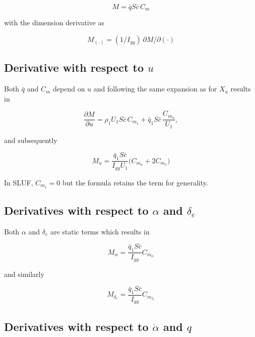 \documentclass[11pt]{article}
\newcommand{\qbar}{\bar{q}}
\newcommand{\cbar}{\bar{c}}
\newcommand{\Iyy}{I_{yy}}
\newcommand{\dd}[2]{\dfrac{\partial #1}{\partial #2}}
\begin{document}
\begin{equation}\label{eq:equation_20}
M = \qbar S \cbar\,C_m
\end{equation}

with the dimension derivative as

\begin{equation}\label{eq:equation_21}
M_{(\cdot)} = (1/\Iyy)\,\partial M/\partial(\cdot)
\end{equation}

\subsection{Derivative with respect to $u$}

Both $\qbar$ and $C_m$ depend on $u$ and following the same expansion as for $X_u$ results in

\begin{equation}\label{eq:equation_22}
\dd{M}{u} = \rho_1 U_1 S\cbar\,C_{m_1} + \qbar_1 S\cbar\,\frac{C_{m_u}}{U_1},
\end{equation}

and subsequently

\begin{equation}\label{eq:equation_23}
\boxed{\;M_u = \frac{\qbar_1 S\cbar}{\Iyy U_1}\bigl(C_{m_u} + 2C_{m_1}\bigr)\;}
\end{equation}

In SLUF, $C_{m_1} = 0$ but the formula retains the term for generality.

\subsection{Derivatives with respect to $\alpha$ and $\delta_e$}

Both $\alpha$ and $\delta_{e}$ are static terms which results in

\begin{equation}\label{eq:equation_24}
\boxed{\;M_\alpha = \frac{\qbar_1 S\cbar}{\Iyy}C_{m_\alpha}\;}
\end{equation}

and similarly

\begin{equation}\label{eq:equation_25}
\boxed{\;M_{\delta_e} = \frac{\qbar_1 S\cbar}{\Iyy}C_{m_{\delta_e}}\;}
\end{equation}

\subsection{Derivatives with respect to $\dot\alpha$ and $q$}
\end{document}
